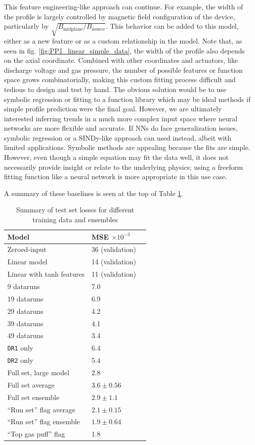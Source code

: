 This feature engineering-like approach can continue. For example, the width of the profile is largely controlled by magnetic field configuration of the device, particularly by $\sqrt{B_\text{midplane}/B_\text{source}}$. This behavior can be added to this model, either as a new feature or as a custom relationship in the model. Note that, as seen in fig. \ref{fig:PP1_linear_simple_data}, the width of the profile also depends on the axial coordinate. Combined with other coordinates and actuators, like discharge voltage and gas pressure, the number of possible features or function space grows combinatorially, making this custom fitting process difficult and tedious to design and test by hand. The obvious solution would be to use symbolic regression or fitting to a function library which may be  ideal methods if simple profile prediction were the final goal. However, we are ultimately interested inferring trends in a much more complex input space where neural networks are more flexible and accurate. If NNs do face generalization issues, symbolic regression or a SINDy-like approach can used instead, albeit with limited applications. Symbolic methods are appealing because the fits are simple. However, even though a simple equation may fit the data well, it does not necessarily provide insight or relate to the underlying physics; using a freeform fitting function like a neural network is more appropriate in this use case.

A summary of these baselines is seen at the top of Table \ref{tab:loss_summary}.


\begin{table}
	\small
	\centering
	\caption{Summary of test set losses for different training data and ensembles}
	\label{tab:loss_summary}
	\begin{tabular}{l l l}
		Model & MSE $\times 10^{-3}$ \\
		\hline
		Zeroed-input & 36  (validation) \\
		Linear model & 14 (validation) \\
		Linear with tanh features & 11 (validation)\\
		\hline
		9 dataruns & 7.0\\
		19 dataruns & 6.9 \\
		29 dataruns & 4.2 \\
		39 dataruns & 4.1 \\ 
		49 dataruns & 3.4 \\
		\texttt{DR1} only & $6.4$ \\
		\texttt{DR2} only & $5.4$ \\
		Full set, large model & $2.8$ \\
		Full set average & $3.6 \pm 0.56$ \\
		Full set ensemble & $2.9 \pm 1.1$ \\
		\hline
		``Run set'' flag average & $2.1 \pm 0.15$ \\
		``Run set'' flag ensemble & $1.9 \pm 0.64$ \\
		``Top gas puff'' flag & 1.8 \\
		
	\end{tabular}
\end{table}

